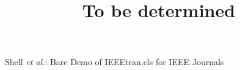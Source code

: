 \documentclass[journal]{IEEEtran}
\begin{document}
%
\title{To be determined}
%
%
%


% 
%



%
{Shell \MakeLowercase{\textit{et al.}}: Bare Demo of IEEEtran.cls for IEEE Journals}
% 
\end{document}
